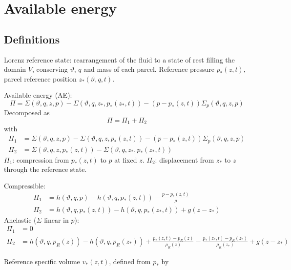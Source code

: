 \documentclass{article}
\begin{document}
\section{Available energy}

\subsection{Definitions}
Lorenz reference state: rearrangement of the fluid to a state of rest filling the domain \(V\), conserving \(\vartheta\), \(q\) and mass of each parcel.
Reference pressure \(p_*(z, t)\), parcel reference position \(z_*(\vartheta, q, t)\).

Available energy (AE):
\begin{equation}
    \Pi
    =
    \Sigma(\vartheta, q, z, p)
    - \Sigma(\vartheta, q, z_*, p_*(z_*, t))
    - (p - p_*(z, t)) \Sigma_p(\vartheta, q, z, p)
\end{equation}
Decomposed as
\begin{equation}
     \Pi = \Pi_1 + \Pi_2
\end{equation}
with
\begin{align}
    \Pi_1
    & =
    \Sigma(\vartheta, q, z, p)
    - \Sigma(\vartheta, q, z, p_*(z, t))
    - (p - p_*(z, t)) \Sigma_p(\vartheta, q, z, p)
    \\
    \Pi_2
    & =
    \Sigma(\vartheta, q, z, p_*(z, t))
    - \Sigma(\vartheta, q, z_*, p_*(z_*, t))
\end{align}
\(\Pi_1\): compression from \(p_*(z, t)\) to \(p\) at fixed \(z\). \(\Pi_2\): displacement from \(z_*\) to \(z\) through the reference state.

Compressible:
\begin{align}
    \Pi_1
    & =
    h(\vartheta, q, p)
    - h(\vartheta, q, p_*(z, t))
    - \frac{p - p_*(z, t)}{\rho}
    \\
    \Pi_2
    & =
    h(\vartheta, q, p_*(z, t))
    - h(\vartheta, q, p_*(z_*, t))
    + g(z - z_*)
\end{align}
Anelastic (\(\Sigma\) linear in \(p\)):
\begin{align}
    \Pi_1
    & = 0
    \\
    \Pi_2
    & =
    h(\vartheta, q, p_R(z))
    - h(\vartheta, q, p_R(z_*))
    + \frac{p_*(z, t) - p_R(z)}{\rho_R(z)}
    - \frac{p_*(z_*, t) - p_R(z_*)}{\rho_R(z_*)}
    + g(z - z_*)
\end{align}

Reference specific volume \(v_*(z, t)\), defined from \(p_*\) by
\end{document}
